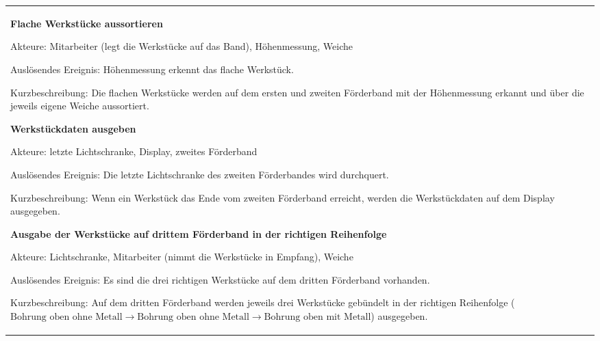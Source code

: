 \documentclass[a4paper, 11pt]{article}
\begin{document}
\begin{table}[h]
    \center
    \begin{tabularx}{\textwidth}{X}

    \begin{compactenum}[1.]
            \item \textbf{Flache Werkstücke aussortieren}
            \medskip

            Akteure: Mitarbeiter (legt die Werkstücke auf das Band), Höhenmessung, Weiche
            \medskip

            Auslösendes Ereignis: Höhenmessung erkennt das flache Werkstück.
            \medskip

            Kurzbeschreibung: Die flachen Werkstücke werden auf dem ersten und zweiten Förderband mit der Höhenmessung erkannt und über die jeweils eigene Weiche aussortiert.
            \bigskip

            \item \textbf{Werkstückdaten ausgeben}
            \medskip

            Akteure: letzte Lichtschranke, Display, zweites Förderband
            \medskip

            Auslösendes Ereignis: Die letzte Lichtschranke des zweiten Förderbandes wird durchquert.
            \medskip

            Kurzbeschreibung: Wenn ein Werkstück das Ende vom zweiten Förderband erreicht, werden die Werkstückdaten auf dem Display ausgegeben.
            \bigskip

            \item \textbf{Ausgabe der Werkstücke auf drittem Förderband in der richtigen Reihenfolge}
            \medskip

            Akteure: Lichtschranke, Mitarbeiter (nimmt die Werkstücke in Empfang), Weiche
            \medskip

            Auslösendes Ereignis: Es sind die drei richtigen Werkstücke auf dem dritten Förderband vorhanden.
            \medskip

            Kurzbeschreibung: Auf dem dritten Förderband werden jeweils drei Werkstücke gebündelt in der richtigen Reihenfolge ($\text{Bohrung oben ohne Metall}\rightarrow \text{Bohrung oben ohne Metall}\rightarrow \text{Bohrung oben mit Metall}$) ausgegeben.
        \end{compactenum}
    \end{tabularx}
\label{ucs}
\end{table}
\end{document}
